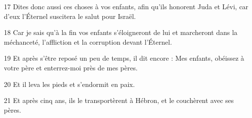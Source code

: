 \par 17 Dites donc aussi ces choses à vos enfants, afin qu'ils honorent Juda et Lévi, car d'eux l'Éternel suscitera le salut pour Israël.

\par 18 Car je sais qu'à la fin vos enfants s'éloigneront de lui et marcheront dans la méchanceté, l'affliction et la corruption devant l'Éternel.

\par 19 Et après s'être reposé un peu de temps, il dit encore : Mes enfants, obéissez à votre père et enterrez-moi près de mes pères.

\par 20 Et il leva les pieds et s'endormit en paix.

\par 21 Et après cinq ans, ils le transportèrent à Hébron, et le couchèrent avec ses pères.



